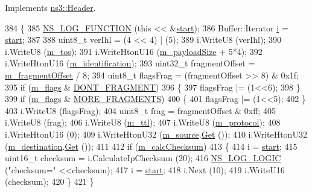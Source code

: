 Implements \hyperlink{classns3_1_1Header_afb61f1aac69ff8349a6bfe521fab5404}{ns3\+::\+Header}.


\begin{DoxyCode}
384 \{
385   \hyperlink{log-macros-disabled_8h_a90b90d5bad1f39cb1b64923ea94c0761}{NS\_LOG\_FUNCTION} (\textcolor{keyword}{this} << &\hyperlink{namespacevisualizer_1_1core_a2a35e5d8a34af358b508dac8635754e0}{start});
386   Buffer::Iterator \hyperlink{bernuolliDistribution_8m_a6f6ccfcf58b31cb6412107d9d5281426}{i} = \hyperlink{namespacevisualizer_1_1core_a2a35e5d8a34af358b508dac8635754e0}{start};
387 
388   uint8\_t verIhl = (4 << 4) | (5);
389   i.WriteU8 (verIhl);
390   i.WriteU8 (\hyperlink{classns3_1_1Ipv4Header_a63a9a2088793d46323e2a2a5cce4260b}{m\_tos});
391   i.WriteHtonU16 (\hyperlink{classns3_1_1Ipv4Header_a5d09939d73631fa3981ec4dfb6cc3481}{m\_payloadSize} + 5*4);
392   i.WriteHtonU16 (\hyperlink{classns3_1_1Ipv4Header_a4cff3bd3c1fa0464a4f8940014e8fa5e}{m\_identification});
393   uint32\_t fragmentOffset = \hyperlink{classns3_1_1Ipv4Header_a1da1027ec79b8089450cad8cc726e1dd}{m\_fragmentOffset} / 8;
394   uint8\_t flagsFrag = (fragmentOffset >> 8) & 0x1f;
395   \textcolor{keywordflow}{if} (\hyperlink{classns3_1_1Ipv4Header_ac43d5aa8e26e2d4cd4cf9520760f7638}{m\_flags} & \hyperlink{classns3_1_1Ipv4Header_a26f8d90c75157c0414fb741ece87a032a68333c7c706b8f2300f634fac93deebd}{DONT\_FRAGMENT}) 
396     \{
397       flagsFrag |= (1<<6);
398     \}
399   \textcolor{keywordflow}{if} (\hyperlink{classns3_1_1Ipv4Header_ac43d5aa8e26e2d4cd4cf9520760f7638}{m\_flags} & \hyperlink{classns3_1_1Ipv4Header_a26f8d90c75157c0414fb741ece87a032a4f8aa2cabec9f9acae9fc9105e38e671}{MORE\_FRAGMENTS}) 
400     \{
401       flagsFrag |= (1<<5);
402     \}
403   i.WriteU8 (flagsFrag);
404   uint8\_t frag = fragmentOffset & 0xff;
405   i.WriteU8 (frag);
406   i.WriteU8 (\hyperlink{classns3_1_1Ipv4Header_a2c4861b795acda1a7d7f2e322afa2f96}{m\_ttl});
407   i.WriteU8 (\hyperlink{classns3_1_1Ipv4Header_a2f5b8e55ff90bbcd93755a127fb0e2f1}{m\_protocol});
408   i.WriteHtonU16 (0);
409   i.WriteHtonU32 (\hyperlink{classns3_1_1Ipv4Header_a091c4da29779b7e0f4b4a486d04ed012}{m\_source}.\hyperlink{classns3_1_1Ipv4Address_ae65810a69898982e927b83660d3bc4d8}{Get} ());
410   i.WriteHtonU32 (\hyperlink{classns3_1_1Ipv4Header_a8953985e448341b24e4ac59bf50f4067}{m\_destination}.\hyperlink{classns3_1_1Ipv4Address_ae65810a69898982e927b83660d3bc4d8}{Get} ());
411 
412   \textcolor{keywordflow}{if} (\hyperlink{classns3_1_1Ipv4Header_afe50955aeda795cbe640f6e8e1626626}{m\_calcChecksum}) 
413     \{
414       i = \hyperlink{namespacevisualizer_1_1core_a2a35e5d8a34af358b508dac8635754e0}{start};
415       uint16\_t checksum = i.CalculateIpChecksum (20);
416       \hyperlink{group__logging_ga88acd260151caf2db9c0fc84997f45ce}{NS\_LOG\_LOGIC} (\textcolor{stringliteral}{"checksum="} <<checksum);
417       i = \hyperlink{namespacevisualizer_1_1core_a2a35e5d8a34af358b508dac8635754e0}{start};
418       i.Next (10);
419       i.WriteU16 (checksum);
420     \}
421 \}
\end{DoxyCode}


